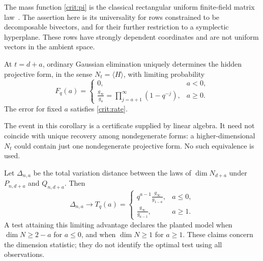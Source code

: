 The mass function \eqref{crit:pi} is the classical rectangular uniform
finite-field matrix law~\cite{FulmanGoldstein2015}. The assertion here is its universality for
rows constrained to be decomposable bivectors, and for their further
restriction to a symplectic hyperplane. These rows have strongly
dependent coordinates and are not uniform vectors in the ambient
space.

\begin{corollary}\label{crit:recovery}
At $t=d+a$, ordinary Gaussian elimination uniquely determines the
hidden projective form, in the sense $N_t=\langle H\rangle$, with
limiting probability
\begin{equation}\label{crit:recoverycurve}
 F_q(a)=
 \begin{cases}
 0,&a<0,\\
 \displaystyle\frac{g_\infty}{g_a}
   =\prod_{j=a+1}^{\infty}(1-q^{-j}),&a\ge0.
 \end{cases}
\end{equation}
The error for fixed $a$ satisfies \eqref{crit:rate}.
\end{corollary}

The event in this corollary is a certificate supplied by linear algebra.
It need not coincide with unique recovery among nondegenerate forms:
a higher-dimensional $N_t$ could contain just one nondegenerate
projective form. No such equivalence is used.

\begin{corollary}\label{crit:testing}
Let $\Delta_{n,a}$ be the total variation distance between the laws of
$\dim N_{d+a}$ under $P_{n,d+a}$ and $Q_{n,d+a}$. Then
\begin{equation}\label{crit:testcurve}
 \Delta_{n,a}\longrightarrow
 T_q(a)=
 \begin{cases}
 \displaystyle q^{a-1}\frac{g_\infty}{g_{1-a}},&a\le0,\\[2mm]
 \displaystyle\frac{g_\infty}{g_{a-1}},&a\ge1.
 \end{cases}
\end{equation}
A test attaining this limiting advantage declares the planted model
when $\dim N\ge2-a$ for $a\le0$, and when $\dim N\ge1$ for $a\ge1$.
These claims concern the dimension statistic; they do not identify the
optimal test using all observations.
\end{corollary}

